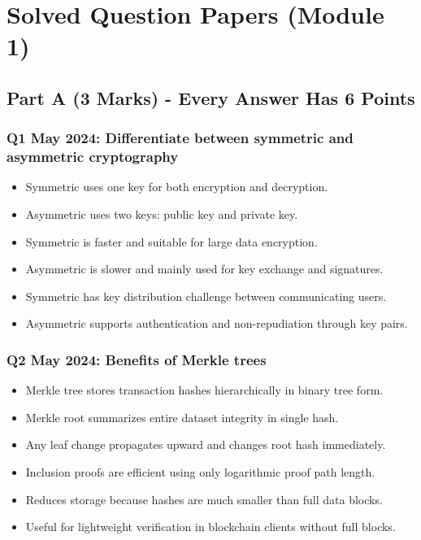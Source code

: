 \documentclass[12pt,a4paper]{article}
\begin{document}
\newpage
\section*{Solved Question Papers (Module 1)}

\subsection*{Part A (3 Marks) - Every Answer Has 6 Points}

\subsubsection*{Q1 May 2024: Differentiate between symmetric and asymmetric cryptography}
\begin{itemize}
\item Symmetric uses one key for both encryption and decryption.
\item Asymmetric uses two keys: public key and private key.
\item Symmetric is faster and suitable for large data encryption.
\item Asymmetric is slower and mainly used for key exchange and signatures.
\item Symmetric has key distribution challenge between communicating users.
\item Asymmetric supports authentication and non-repudiation through key pairs.
\end{itemize}

\subsubsection*{Q2 May 2024: Benefits of Merkle trees}
\begin{itemize}
\item Merkle tree stores transaction hashes hierarchically in binary tree form.
\item Merkle root summarizes entire dataset integrity in single hash.
\item Any leaf change propagates upward and changes root hash immediately.
\item Inclusion proofs are efficient using only logarithmic proof path length.
\item Reduces storage because hashes are much smaller than full data blocks.
\item Useful for lightweight verification in blockchain clients without full blocks.
\end{itemize}
\end{document}
